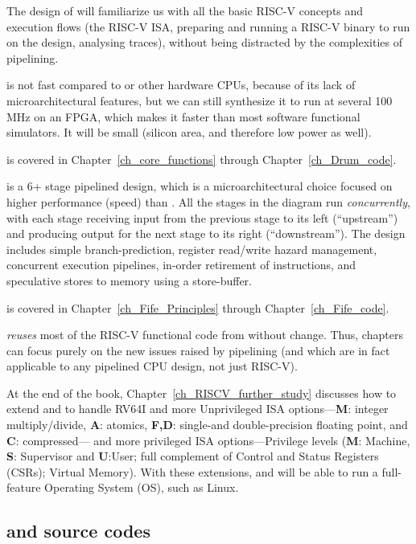 The design of {\DRUM} will familiarize us with all the basic RISC-V
concepts and execution flows (the RISC-V ISA, preparing and running a
RISC-V binary to run on the design, analysing traces), without being
distracted by the complexities of pipelining.

{\DRUM} is not fast compared to {\FIFE} or other hardware CPUs, because of
its lack of microarchitectural features, but we can still synthesize
it to run at several 100 MHz on an FPGA, which makes it faster than
most software functional simulators.  It will be small (silicon area,
and therefore low power as well).

{\DRUM} is covered in Chapter~\ref{ch_core_functions} through
Chapter~\ref{ch_Drum_code}.

{\FIFE} is a 6+ stage pipelined design, which is a microarchitectural
choice focused on higher performance (speed) than {\DRUM}.  All the
stages in the diagram run \emph{concurrently}, with each stage
receiving input from the previous stage to its left (``upstream'') and
producing output for the next stage to its right (``downstream'').
The design includes simple branch-prediction, register read/write
hazard management, concurrent execution pipelines, in-order retirement
of instructions, and speculative stores to memory using a
store-buffer.

{\FIFE} is covered in Chapter~\ref{ch_Fife_Principles} through
Chapter~\ref{ch_Fife_code}.

{\FIFE} \emph{reuses} most of the RISC-V functional code from {\DRUM}
without change.  Thus, {\FIFE} chapters can focus purely on the new
issues raised by pipelining (and which are in fact applicable to any
pipelined CPU design, not just RISC-V).

At the end of the book, Chapter~\ref{ch_RISCV_further_study} discusses
how to extend {\DRUM} and {\FIFE} to handle RV64I and more
Unprivileged ISA options---{\bf M}: integer multiply/divide, {\bf A}:
atomics, {\bf F,D}: single-and double-precision floating point, and
{\bf C}: compressed--- and more privileged ISA options---Privilege
levels ({\bf M}: Machine, {\bf S}: Supervisor and {\bf U}:User; full
complement of Control and Status Registers (CSRs); Virtual Memory).
With these extensions, {\DRUM} and {\FIFE} will be able to run a
full-feature Operating System (OS), such as Linux.


\subsection{{\DRUM} and {\FIFE} source codes}

